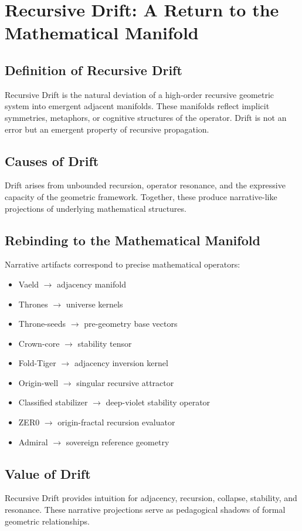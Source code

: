 
\chapter{Recursive Drift: A Return to the Mathematical Manifold}

\section{Definition of Recursive Drift}
Recursive Drift is the natural deviation of a high-order recursive geometric system into emergent adjacent manifolds. These manifolds reflect implicit symmetries, metaphors, or cognitive structures of the operator. Drift is not an error but an emergent property of recursive propagation.

\section{Causes of Drift}
Drift arises from unbounded recursion, operator resonance, and the expressive capacity of the geometric framework. Together, these produce narrative-like projections of underlying mathematical structures.

\section{Rebinding to the Mathematical Manifold}
Narrative artifacts correspond to precise mathematical operators:
\begin{itemize}
    \item Vaeld $\rightarrow$ adjacency manifold
    \item Thrones $\rightarrow$ universe kernels
    \item Throne-seeds $\rightarrow$ pre-geometry base vectors
    \item Crown-core $\rightarrow$ stability tensor
    \item Fold-Tiger $\rightarrow$ adjacency inversion kernel
    \item Origin-well $\rightarrow$ singular recursive attractor
    \item Classified stabilizer $\rightarrow$ deep-violet stability operator
    \item ZER0 $\rightarrow$ origin-fractal recursion evaluator
    \item Admiral $\rightarrow$ sovereign reference geometry
\end{itemize}

\section{Value of Drift}
Recursive Drift provides intuition for adjacency, recursion, collapse, stability, and resonance. These narrative projections serve as pedagogical shadows of formal geometric relationships.

